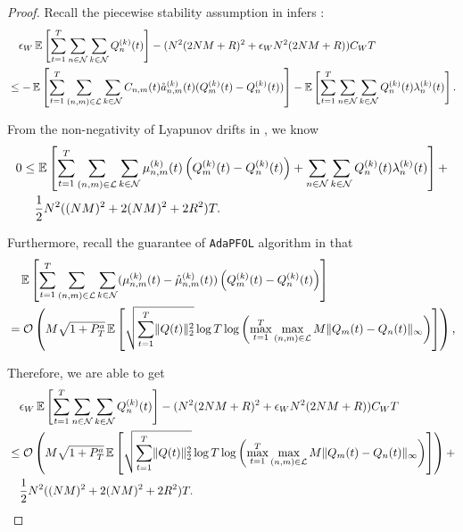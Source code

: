 \documentclass[11pt,fullpage,letterpaper]{article} %
\renewcommand{\bm}[1]{#1}%
\renewcommand{\O}{\operatorname{\mathcal O}}
\newcommand{\E}{\operatornamewithlimits{\mathbb{E}}}
\newcommand{\mN}{{\mathcal N}}
\newcommand{\mL}{{\mathcal L}}
\newcommand{\OLOAlg}{\texttt{AdaPFOL}\xspace}
\begin{document}
\begin{proof}
Recall the piecewise stability assumption in  infers :
\begin{align*}
&\quad \epsilon_W \E\left [\sum_{t=1}^T \sum_{n\in \mN} \sum_{k\in \mN} Q_n^{(k)}(t)\right ] - (N^2 (2NM+R)^2 + \epsilon_W N^2 (2NM+R)) C_W T \\
&\le-\E\left [\sum_{t=1}^T \sum_{(n,m)\in \mL} \sum_{k\in \mN} C_{n,m}(t) \mathring{a}_{n,m}^{(k)}(t) (Q_m^{(k)}(t) - Q_n^{(k)}(t))\right ]-\E\left [\sum_{t=1}^T \sum_{n\in \mN} \sum_{k\in \mN} Q_n^{(k)}(t) \lambda_n^{(k)}(t)\right ].
\end{align*}

From the non-negativity of Lyapunov drifts in , we know
\begin{align*}
0&\le \E\left [\sum_{t=1}^T \sum_{(n,m)\in \mL} \sum_{k\in \mN} \mu_{n,m}^{(k)}(t)\left (Q_m^{(k)}(t)-Q_n^{(k)}(t)\right ) + \sum_{n\in \mN} \sum_{k\in \mN} Q_n^{(k)}(t) \lambda_n^{(k)}(t)\right ] + \nonumber \\
&\quad \frac 12 N^2 ((NM)^2+2(NM)^2+2R^2) T.
\end{align*}

Furthermore, recall the guarantee of \OLOAlg algorithm in  that
\begin{align*}
&\quad \E\left [\sum_{t=1}^T \sum_{(n,m)\in \mL} \sum_{k\in \mN} (\mu_{n,m}^{(k)}(t)-\mathring{\mu}_{n,m}^{(k)}(t))\left (Q_m^{(k)}(t)-Q_n^{(k)}(t)\right )\right ]\\
&=\O\left (M\sqrt{1+P_T^a} \E\left [\sqrt{\sum_{t=1}^T \lVert \bm Q(t)\rVert_2^2} \log T \log \left (\max_{t=1}^T \max_{(n,m)\in \mL} M \lVert \bm Q_m(t) - \bm Q_n(t)\rVert_\infty\right )\right ]\right )\text{,}
\end{align*}

Therefore, we are able to get
\begin{align*}
&\quad \epsilon_W \E\left [\sum_{t=1}^T \sum_{n\in \mN} \sum_{k\in \mN} Q_n^{(k)}(t)\right ] - (N^2 (2NM+R)^2 + \epsilon_W N^2 (2NM+R)) C_W T\\
&\le \O\left (M\sqrt{1+P_T^a} \E\left [\sqrt{\sum_{t=1}^T \lVert \bm Q(t)\rVert_2^2} \log T \log \left (\max_{t=1}^T \max_{(n,m)\in \mL} M \lVert \bm Q_m(t) - \bm Q_n(t)\rVert_\infty\right )\right ]\right ) + \\
&\quad \frac 12 N^2 ((NM)^2+2(NM)^2+2R^2) T.
\end{align*}


\end{proof}
\end{document}
